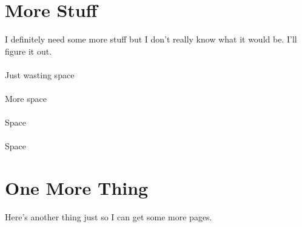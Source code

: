 \documentclass[11pt]{SelfArxOneColBMN}
\begin{document}
\section{More Stuff}
\label{sec:more stuff}

\noindent
I definitely need some more stuff but I don't really know what it would be. I'll figure it out.\\
\\
Just wasting space\\
\\
More space\\
\\
Space\\
\\
Space

\section{One More Thing}
\label{sec:one more thing}
Here's another thing just so I can get some more pages.
\end{document}
